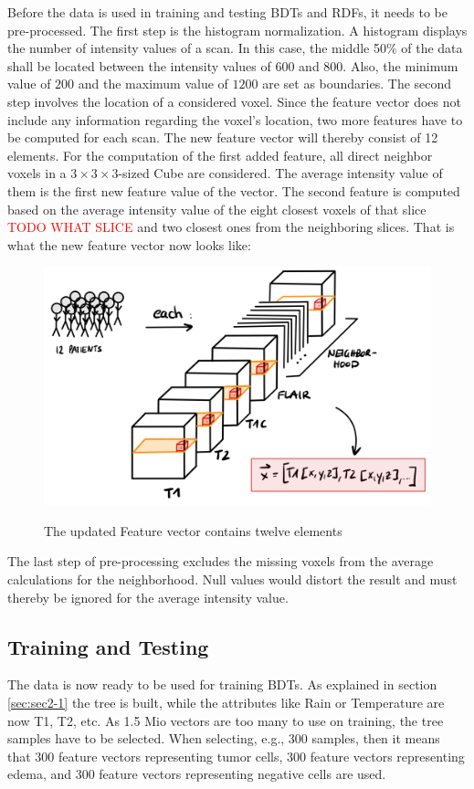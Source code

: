 \documentclass[
12pt,
headsepline,
bibliography=totoc,
twoside=semi,
fleqn
]{scrartcl}
\begin{document}
 Before the data is used in training and testing BDTs and RDFs, it needs to be pre-processed. The first step is the histogram normalization. A histogram displays the number of intensity values of a scan. In this case, the middle 50$\%$ of the data shall be located between the intensity values of $600$ and $800$. Also, the minimum value of $200$ and the maximum value of $1200$ are set as boundaries. The second step involves the location of a considered voxel. Since the feature vector does not include any information regarding the voxel's location, two more features have to be computed for each scan. The new feature vector will thereby consist of 12 elements. For the computation of the first added feature, all direct neighbor voxels in a $3 \times 3 \times 3$-sized Cube are considered. The average intensity value of them is the first new feature value of the vector. The second feature is computed based on the average intensity value of the eight closest voxels of that slice \textcolor{red}{TODO WHAT SLICE} and two closest ones from the neighboring slices. That is what the new feature vector now looks like: 

 \begin{figure}[H]
 \centering \includegraphics[scale=0.7]{BDT15.png}\label{fig:fig15}
 \caption{The updated Feature vector contains twelve elements}
 \end{figure}

 The last step of pre-processing excludes the missing voxels from the average calculations for the neighborhood. Null values would distort the result and must thereby be ignored for the average intensity value. 

 \subsection{Training and Testing\label{sec:sec3-3}}
 The data is now ready to be used for training BDTs. As explained in section \ref{sec:sec2-1} the tree is built, while the attributes like Rain or Temperature are now T1, T2, etc. As 1.5 Mio vectors are too many to use on training, the tree samples have to be selected. When selecting, e.g., 300 samples, then it means that 300 feature vectors representing tumor cells, 300 feature vectors representing edema, and 300 feature vectors representing negative cells are used. 
 
\end{document}
